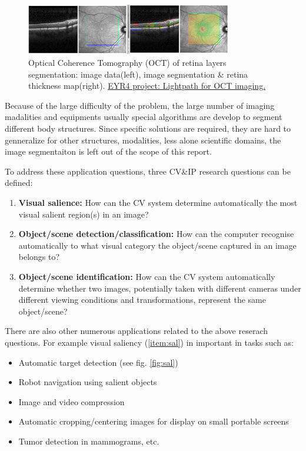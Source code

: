 \begin{figure}[H]
\begin{center}
\includegraphics[width=0.8\textwidth]{fig/oct}
\end{center}
\caption{Optical Coherence Tomography (OCT) of retina layers segmentation: image data(left), image segmentation \& retina thickness map(right). \href{https://blog.surf.nl/eyr4-blog-7-lightpath-optical-coherence-tomography-oct-imaging/}{ EYR4 project: Lightpath for OCT imaging.}}
\label{fig:oct}
\end{figure}

Because of the large difficulty of the problem, the large number of imaging madalities and equipments usually special algorithms are develop to segment different body structures. Since specific solutions are required, they are hard to genneralize for other structures, modalities, less alone scientific domains, the image segmentaiton is left out of the scope of this report.

To address these application questions, three  CV\&IP research questions can be defined:
\begin{enumerate}
\item {\bf Visual salience:} How can the CV system determine automatically the most visual salient region(s) in an image?\label{item:sal}
\item {\bf Object/scene detection/classification:} How can the computer recognise automatically to what visual category the object/scene captured in an image belongs to? \label{item:und}
\item {\bf Object/scene identification:} How can the CV system automatically determine whether two images, potentially taken with different cameras under different viewing conditions and transformations, represent the same object/scene?\label{item:ident}
\end{enumerate}

There are also other numerous applications related to the above reserach  questions. For example visual saliency (\ref{item:sal}) in important in tasks such as:
\begin{itemize}
\item Automatic target detection (see fig. \ref{fig:sal})
\item Robot navigation using salient objects
\item Image and video compression
\item Automatic cropping/centering images for display on small portable screens
\item Tumor detection in mammograms, etc.
\end{itemize}

